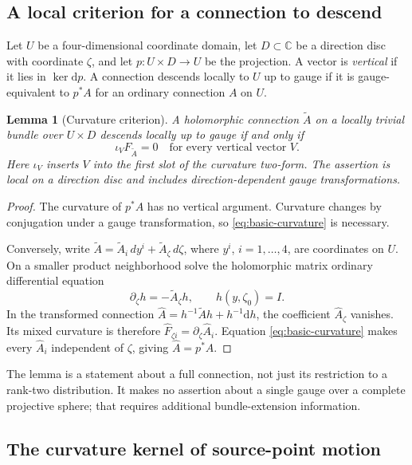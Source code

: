 \documentclass[11pt]{article}
\numberwithin{equation}{section}
\newtheorem{lemma}[theorem]{Lemma}
\theoremstyle{definition}
\theoremstyle{remark}
\newcommand{\C}{\mathbb C}
\newcommand{\dd}{\mathrm d}
\begin{document}
\subsection{A local criterion for a connection to descend}

Let $U$ be a four-dimensional coordinate domain, let $D\subset\C$ be a direction disc with coordinate $\zeta$, and let $p:U\times D\to U$ be the projection. A vector is \emph{vertical} if it lies in $\ker\dd p$. A connection descends locally to $U$ up to gauge if it is gauge-equivalent to $p^*A$ for an ordinary connection $A$ on $U$.

\begin{lemma}[Curvature criterion]\label{lem:basic}
A holomorphic connection $\widetilde A$ on a locally trivial bundle over $U\times D$ descends locally up to gauge if and only if
\begin{equation}\label{eq:basic-curvature}
\iota_V F_{\widetilde A}=0
\quad\text{for every vertical vector }V.
\end{equation}
Here $\iota_V$ inserts $V$ into the first slot of the curvature two-form. The assertion is local on a direction disc and includes direction-dependent gauge transformations.
\end{lemma}
\begin{proof}
The curvature of $p^*A$ has no vertical argument. Curvature changes by conjugation under a gauge transformation, so \eqref{eq:basic-curvature} is necessary.

Conversely, write $\widetilde A=\widetilde A_i\,dy^i+\widetilde A_\zeta\,d\zeta$, where $y^i$, $i=1,\ldots,4$, are coordinates on $U$. On a smaller product neighborhood solve the holomorphic matrix ordinary differential equation
\[
\partial_\zeta h=-\widetilde A_\zeta h,
\qquad h(y,\zeta_0)=I.
\]
In the transformed connection $\widehat A=h^{-1}\widetilde A h+h^{-1}\dd h$, the coefficient $\widehat A_\zeta$ vanishes. Its mixed curvature is therefore $\widehat F_{\zeta i}=\partial_\zeta\widehat A_i$. Equation \eqref{eq:basic-curvature} makes every $\widehat A_i$ independent of $\zeta$, giving $\widehat A=p^*A$.
\end{proof}

The lemma is a statement about a full connection, not just its restriction to a rank-two distribution. It makes no assertion about a single gauge over a complete projective sphere; that requires additional bundle-extension information.

\subsection{The curvature kernel of source-point motion}
\end{document}
